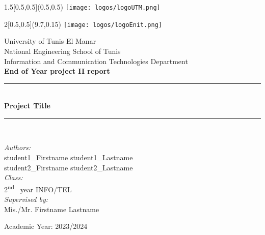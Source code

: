 
\begin{titlepage}
\BgThispage
\begin{textblock}{1.5}[0.5,0.5](0.5,0.5)
	\texttt{[image: logos/logoUTM.png]}\\[3.5cm]
  \end{textblock}
  
\begin{textblock}{2}[0.5,0.5](9.7,0.15)
	\texttt{[image: logos/logoEnit.png]}\\[2cm]
  \end{textblock}
  
  
\bigskip
\bigskip
\begin{center}
{ \large{University of Tunis El Manar\\[0.2cm]
National Engineering School of Tunis\\[0.2cm]
Information and Communication Technologies Department}}\\[1cm]

{\large \textbf{End of Year project II report}}\\[0.6cm]

\rule{\linewidth}{0.5mm} \\[0.1cm]
{ \huge \bfseries Project Title
 \\[0.1cm] }
\rule{\linewidth}{0.5mm} \\[1.5cm]

\noindent

{\Large  \emph{Authors:}}\\[0.3cm]
{\large  
  student1\_Firstname student1\_Lastname \\[0.2cm]
  student2\_Firstname student2\_Lastname 
  } \\[1cm]  

{\Large  \emph{Class:}}\\[0.3cm]
{\large 2\textsuperscript{nd}~ year INFO/TEL} \\[1cm]

{\Large  \emph{Supervised by:}}\\[0.3cm]
 {\large  Mis./Mr. Firstname Lastname}





\vspace{4cm}

{Academic Year: 2023/2024}
\end{center}


\end{titlepage}